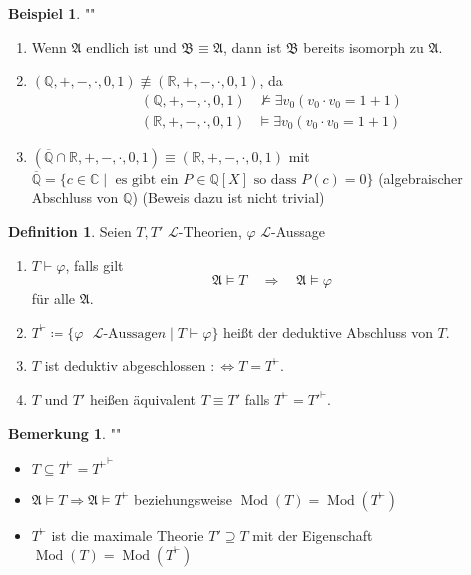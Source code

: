 \documentclass[12pt,parskip=full]{scrartcl}
\newcommand{\setQ}{\mathbb{Q}}
\newcommand{\setR}{\mathbb{R}}
\newcommand{\setC}{\mathbb{C}}
\theoremstyle{definition}
\newtheorem{definition}[theorem]{Definition}
\newtheorem{example}[theorem]{Beispiel}
\newtheorem{remark}[theorem]{Bemerkung}
\begin{document}
	\begin{example}""
		\begin{enumerate}
			\item Wenn $\mathfrak{A}$ endlich ist und $\mathfrak{B} \equiv \mathfrak{A}$, dann ist $\mathfrak{B}$ bereits isomorph zu $\mathfrak{A}$.
			\item $(\setQ, +, -, \cdot, 0, 1) \not\equiv (\setR, +, - , \cdot, 0, 1)$, da
			\begin{align*}
				(\setQ, +, -, \cdot, 0, 1) &\not\models \exists v_0 (v_0 \cdot v_0 = 1 + 1) \\(\setR, +, -, \cdot, 0, 1) &\models \exists v_0 (v_0 \cdot v_0 = 1 + 1)
			\end{align*}
			\item $(\overline{\setQ} \cap \setR, +, -, \cdot, 0, 1) \equiv (\setR, +, -, \cdot, 0, 1)$ mit $\overline{\setQ} = \{ c \in \setC \mid \text{ es gibt ein $P \in \setQ[X]$ so dass $P(c) = 0$} \}$ (algebraischer Abschluss von $\setQ$) (Beweis dazu ist nicht trivial)
		\end{enumerate}
	\end{example}

	\begin{definition}
		Seien $T, T'$ $\mathcal{L}$-Theorien, $\varphi$ $\mathcal{L}$-Aussage
		\begin{enumerate}
			\item $T \vdash \varphi$, falls gilt
			\begin{equation*}
				\mathfrak{A} \models T \quad\Longrightarrow\quad \mathfrak{A} \models \varphi
			\end{equation*}
			für alle $\mathfrak{A}$.
			\item $T^\vdash \coloneqq \{ \varphi \text{ $\mathcal{L}$-Aussage}n \mid T \vdash \varphi \}$ heißt der deduktive Abschluss von $T$.
			\item $T$ ist deduktiv abgeschlossen $:\Leftrightarrow T = T^\vdash$.
			\item $T$ und $T'$ heißen äquivalent $T \equiv T'$ falls $T^\vdash = T'^\vdash$.
		\end{enumerate}
	\end{definition}

	\begin{remark}""
		\begin{itemize}
			\item $T \subseteq T^\vdash = {T^\vdash}^\vdash$
			\item $\mathfrak{A} \models T \Rightarrow \mathfrak{A} \models T^\vdash$ beziehungsweise $\operatorname{Mod}(T) = \operatorname{Mod}(T^\vdash)$
			\item $T^\vdash$ ist die maximale Theorie $T' \supseteq T$ mit der Eigenschaft $\operatorname{Mod}(T) = \operatorname{Mod}(T^\vdash)$
		\end{itemize}
	\end{remark}
\end{document}
